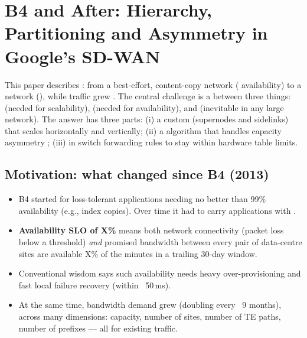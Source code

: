 \chapter{B4 and After: Hierarchy, Partitioning and Asymmetry in Google's SD-WAN}

\begin{keybox}
This paper describes : from a best-effort, content-copy network ( availability) to a  network (), while traffic grew . The central challenge is a  between three things:  (needed for scalability),  (needed for availability), and  (inevitable in any large network). The answer has three parts: (i) a custom  (supernodes and sidelinks) that scales horizontally and vertically; (ii) a  algorithm that handles capacity asymmetry ; (iii)  in switch forwarding rules to stay within hardware table limits.
\end{keybox}

\section{Motivation: what changed since B4 (2013)}
\begin{itemize}
\item B4 started for loss-tolerant applications needing no better than 99\% availability (e.g., index copies). Over time it had to carry applications with .
\item \textbf{Availability SLO of X\%} means both network connectivity (packet loss below a threshold) \emph{and} promised bandwidth between every pair of data-centre sites are available X\% of the minutes in a trailing 30-day window.
\item Conventional wisdom says such availability needs heavy over-provisioning and fast local failure recovery (within ~50\,ms).
\item At the same time, bandwidth demand grew  (doubling every ~9 months), across many dimensions: capacity, number of sites, number of TE paths, number of prefixes --- all  for existing traffic.
\end{itemize}

